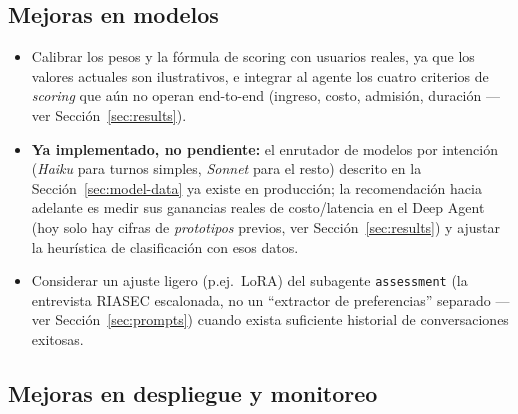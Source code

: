 \subsection{Mejoras en modelos}

\begin{itemize}[noitemsep]
  \item Calibrar los pesos y la f\'ormula de scoring con usuarios reales, ya que
        los valores actuales son ilustrativos, e integrar al agente los cuatro
        criterios de \emph{scoring} que a\'un no operan end-to-end (ingreso,
        costo, admisi\'on, duraci\'on --- ver Secci\'on~\ref{sec:results}).
  \item \textbf{Ya implementado, no pendiente:} el enrutador de modelos por
        intenci\'on (\emph{Haiku} para turnos simples, \emph{Sonnet} para el
        resto) descrito en la Secci\'on~\ref{sec:model-data} ya existe en
        producci\'on; la recomendaci\'on hacia adelante es medir sus ganancias
        reales de costo/latencia en el Deep Agent (hoy solo hay cifras de
        \emph{prototipos} previos, ver Secci\'on~\ref{sec:results}) y ajustar
        la heur\'istica de clasificaci\'on con esos datos.
  \item Considerar un ajuste ligero (p.ej.\ LoRA) del subagente
        \texttt{assessment} (la entrevista RIASEC escalonada, no un
        ``extractor de preferencias'' separado --- ver
        Secci\'on~\ref{sec:prompts}) cuando exista suficiente historial de
        conversaciones exitosas.
\end{itemize}

\subsection{Mejoras en despliegue y monitoreo}

